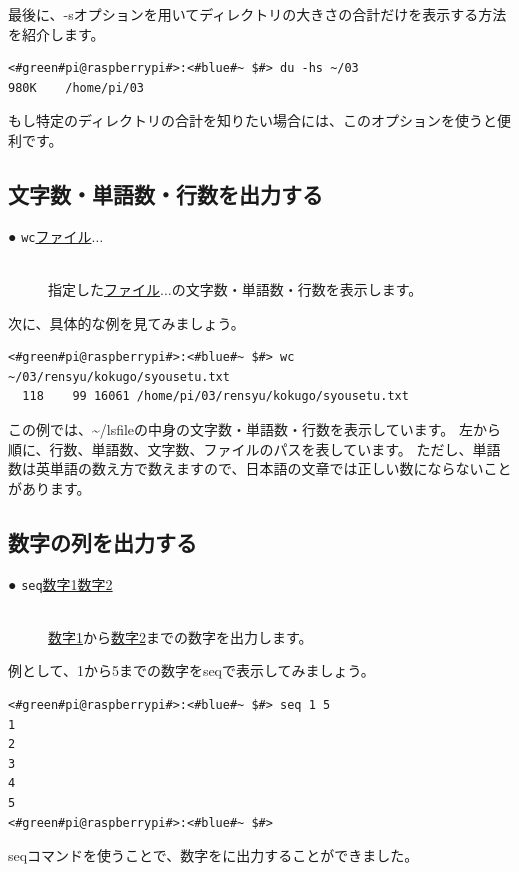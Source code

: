 \documentclass[text03.tex]{subfiles}
\begin{document}
最後に、-sオプションを用いてディレクトリの大きさの合計だけを表示する方法を紹介します。
\begin{lstlisting}[caption=du -hsの実行例, label=du_example]
<#green#pi@raspberrypi#>:<#blue#~ $#> du -hs ~/03
980K	/home/pi/03
\end{lstlisting}
もし特定のディレクトリの合計を知りたい場合には、このオプションを使うと便利です。

\subsection{文字数・単語数・行数を出力する}
\begin{description}
    \item[● \texttt{wc}\textvisiblespace \underline{ファイル}$\ldots$]\mbox{}\\
    指定した\underline{ファイル}$\ldots$の文字数・単語数・行数を表示します。
\end{description}
次に、具体的な例を見てみましょう。
\begin{lstlisting}[caption=wcコマンドの実行例, label=wc_example]
<#green#pi@raspberrypi#>:<#blue#~ $#> wc ~/03/rensyu/kokugo/syousetu.txt
  118    99 16061 /home/pi/03/rensyu/kokugo/syousetu.txt
\end{lstlisting}
この例では、\textasciitilde/lsfileの中身の文字数・単語数・行数を表示しています。
左から順に、行数、単語数、文字数、ファイルのパスを表しています。
ただし、単語数は英単語の数え方で数えますので、日本語の文章では正しい数にならないことがあります。

\subsection{数字の列を出力する}
\begin{description}
    \item[● \texttt{seq}\textvisiblespace \underline{数字1}\textvisiblespace \underline{数字2}]\mbox{}\\
    \underline{数字1}から\underline{数字2}までの数字を出力します。
\end{description}
例として、1から5までの数字をseqで表示してみましょう。
\begin{lstlisting}[caption=seqコマンド]
<#green#pi@raspberrypi#>:<#blue#~ $#> seq 1 5
1
2
3
4
5
<#green#pi@raspberrypi#>:<#blue#~ $#>
\end{lstlisting}
seqコマンドを使うことで、数字をに出力することができました。
\end{document}
